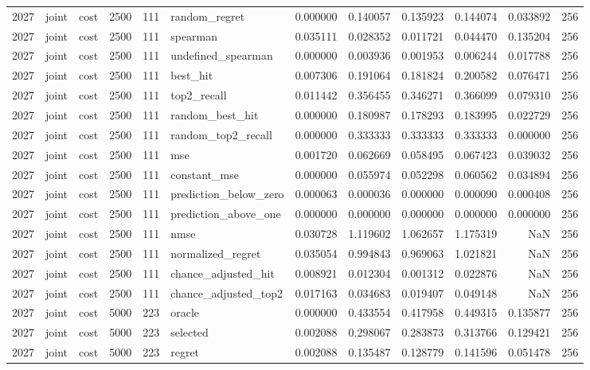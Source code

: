 \begin{tabular}{rllrrlrrrrrr}
2027 & joint & cost & 2500 & 111 & random_regret & 0.000000 & 0.140057 & 0.135923 & 0.144074 & 0.033892 & 256 \\
2027 & joint & cost & 2500 & 111 & spearman & 0.035111 & 0.028352 & 0.011721 & 0.044470 & 0.135204 & 256 \\
2027 & joint & cost & 2500 & 111 & undefined_spearman & 0.000000 & 0.003936 & 0.001953 & 0.006244 & 0.017788 & 256 \\
2027 & joint & cost & 2500 & 111 & best_hit & 0.007306 & 0.191064 & 0.181824 & 0.200582 & 0.076471 & 256 \\
2027 & joint & cost & 2500 & 111 & top2_recall & 0.011442 & 0.356455 & 0.346271 & 0.366099 & 0.079310 & 256 \\
2027 & joint & cost & 2500 & 111 & random_best_hit & 0.000000 & 0.180987 & 0.178293 & 0.183995 & 0.022729 & 256 \\
2027 & joint & cost & 2500 & 111 & random_top2_recall & 0.000000 & 0.333333 & 0.333333 & 0.333333 & 0.000000 & 256 \\
2027 & joint & cost & 2500 & 111 & mse & 0.001720 & 0.062669 & 0.058495 & 0.067423 & 0.039032 & 256 \\
2027 & joint & cost & 2500 & 111 & constant_mse & 0.000000 & 0.055974 & 0.052298 & 0.060562 & 0.034894 & 256 \\
2027 & joint & cost & 2500 & 111 & prediction_below_zero & 0.000063 & 0.000036 & 0.000000 & 0.000090 & 0.000408 & 256 \\
2027 & joint & cost & 2500 & 111 & prediction_above_one & 0.000000 & 0.000000 & 0.000000 & 0.000000 & 0.000000 & 256 \\
2027 & joint & cost & 2500 & 111 & nmse & 0.030728 & 1.119602 & 1.062657 & 1.175319 & NaN & 256 \\
2027 & joint & cost & 2500 & 111 & normalized_regret & 0.035054 & 0.994843 & 0.969063 & 1.021821 & NaN & 256 \\
2027 & joint & cost & 2500 & 111 & chance_adjusted_hit & 0.008921 & 0.012304 & 0.001312 & 0.022876 & NaN & 256 \\
2027 & joint & cost & 2500 & 111 & chance_adjusted_top2 & 0.017163 & 0.034683 & 0.019407 & 0.049148 & NaN & 256 \\
2027 & joint & cost & 5000 & 223 & oracle & 0.000000 & 0.433554 & 0.417958 & 0.449315 & 0.135877 & 256 \\
2027 & joint & cost & 5000 & 223 & selected & 0.002088 & 0.298067 & 0.283873 & 0.313766 & 0.129421 & 256 \\
2027 & joint & cost & 5000 & 223 & regret & 0.002088 & 0.135487 & 0.128779 & 0.141596 & 0.051478 & 256 \\

\end{tabular}
